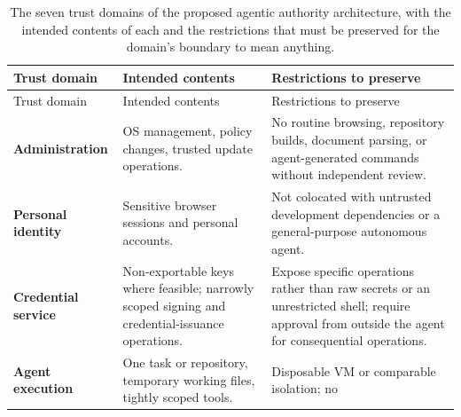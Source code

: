 \documentclass[
  english,
  9pt,
]{extarticle}
\begin{document}
\begin{longtable}[]{@{}
  >{\raggedright\arraybackslash}p{}
  >{\raggedright\arraybackslash}p{}
  >{\raggedright\arraybackslash}p{}@{}}
\caption{The seven trust domains of the proposed agentic authority
architecture, with the intended contents of each and the restrictions
that must be preserved for the domain's boundary to mean
anything.}\label{tbl:trust_domains}\tabularnewline
\toprule\noalign{}
\begin{minipage}[b]{\linewidth}\raggedright
Trust domain
\end{minipage} & \begin{minipage}[b]{\linewidth}\raggedright
Intended contents
\end{minipage} & \begin{minipage}[b]{\linewidth}\raggedright
Restrictions to preserve
\end{minipage} \\
\midrule\noalign{}
\endfirsthead
\toprule\noalign{}
\begin{minipage}[b]{\linewidth}\raggedright
Trust domain
\end{minipage} & \begin{minipage}[b]{\linewidth}\raggedright
Intended contents
\end{minipage} & \begin{minipage}[b]{\linewidth}\raggedright
Restrictions to preserve
\end{minipage} \\
\midrule\noalign{}
\endhead
\bottomrule\noalign{}
\endlastfoot
\textbf{Administration} & OS management, policy changes, trusted update
operations. & No routine browsing, repository builds, document parsing,
or agent-generated commands without independent review. \\
\textbf{Personal identity} & Sensitive browser sessions and personal
accounts. & Not colocated with untrusted development dependencies or a
general-purpose autonomous agent. \\
\textbf{Credential service} & Non-exportable keys where feasible;
narrowly scoped signing and credential-issuance operations. & Expose
specific operations rather than raw secrets or an unrestricted shell;
require approval from outside the agent for consequential operations. \\
\textbf{Agent execution} & One task or repository, temporary working
files, tightly scoped tools. & Disposable VM or comparable isolation; no

\end{longtable}
\end{document}
